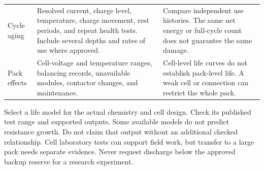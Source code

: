 \documentclass[11pt,a4paper]{report}
\begin{document}
\begin{longtable}{L{0.18\textwidth}L{0.35\textwidth}L{0.35\textwidth}}
Cycle aging & Resolved current, charge level, temperature, charge movement, rest periods, and repeat health tests. Include several depths and rates of use where approved. & Compare independent use histories. The same net energy or full-cycle count does not guarantee the same damage. \\
Pack effects & Cell-voltage and temperature ranges, balancing records, unavailable modules, contactor changes, and maintenance. & Cell-level life curves do not establish pack-level life. A weak cell or connection can restrict the whole pack. \\
\bottomrule
\end{longtable}

Select a life model for the actual chemistry and cell design.
Check its published test range and supported outputs.
Some available models do not predict resistance growth.
Do not claim that output without an additional checked relationship.
Cell laboratory tests can support field work, but transfer to a large pack needs separate evidence.
Never request discharge below the approved backup reserve for a research experiment.
\end{document}
